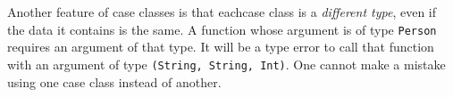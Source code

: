 Another feature of case classes is that eachcase class is a \emph{different
type}, even if the data it contains is the same. A function whose
argument is of type \lstinline!Person! requires an argument of that
type. It will be a type error to call that function with an argument
of type \lstinline!(String, String, Int)!. One cannot make a mistake
using one case class instead of another. 
